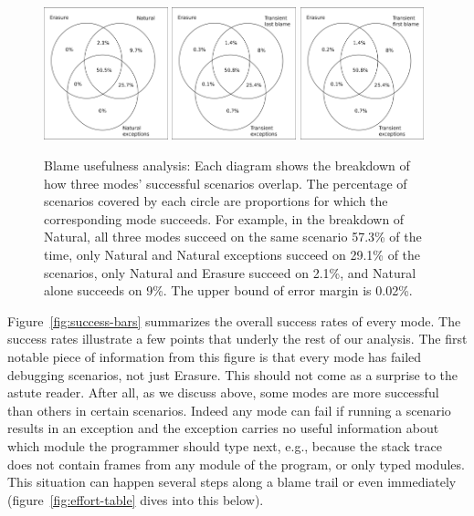 \begin{figure}
  \centering
  \includegraphics[width=0.32\textwidth]{./plots/TR-TR-stack-first-venn}
  \hfill
  \includegraphics[width=0.32\textwidth]{./plots/transient-newest-transient-stack-first-venn}
  \hfill
  \includegraphics[width=0.32\textwidth]{./plots/transient-oldest-transient-stack-first-venn}

  \caption{Blame usefulness analysis: Each diagram shows the breakdown of how three modes' successful scenarios overlap.
  The percentage of scenarios covered by each circle are proportions for which the corresponding mode succeeds.
  For example, in the breakdown of Natural, all three modes succeed on the same scenario 57.3\% of the time, only Natural and Natural exceptions succeed on 29.1\% of the scenarios, only Natural and Erasure succeed on 2.1\%, and Natural alone succeeds on 9\%.
  The upper bound of error margin is 0.02\%.
  }
  \label{fig:success-venns}
\end{figure}


Figure~\ref{fig:success-bars} summarizes the overall success rates of every mode.
The success rates illustrate a few points that underly the rest of our analysis.
The first notable piece of information from
this figure is that every mode has failed debugging scenarios, not just
Erasure. This should
not come as a surprise to the astute
reader. After all, as we
discuss above, some modes are more successful than others in certain
scenarios. Indeed any mode can fail if running a scenario results in an
exception and the exception carries no useful information about which
module the programmer should type next, e.g., because the stack trace 
does not contain frames from any module of the program, or only typed modules. This situation
can happen several steps along a blame trail or even immediately (figure~\ref{fig:effort-table} dives into this below).

